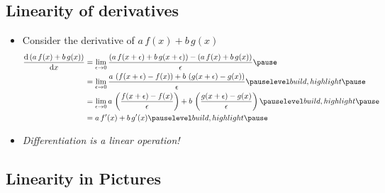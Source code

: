 \begin{slide}
\section{Linearity of derivatives}
  
\begin{PauseHighLight}
  \begin{itemize}
    \item Consider the derivative of $a\,f(x)+b\,g(x)$
    \begin{align*}
      \frac{\dd \bra{a\,f(x)+b\,g(x)}}{\dd x}
      &=
      \lim_{\epsilon\rightarrow 0}
      \frac{\bra{a\,f(x+\epsilon)+b\,g(x+\epsilon)}-\bra{a\,f(x)+b\,g(x)}}{\epsilon}
      \pause \\
      &=
      \lim_{\epsilon\rightarrow 0}
      \frac{a\, \bra{f(x+\epsilon)-f(x)} + b\,\bra{g(x+\epsilon)-g(x)}}{\epsilon}
      \pauseb \\
      &=  \lim_{\epsilon\rightarrow 0}
        a\, \bra{\frac{f(x+\epsilon)-f(x)}{\epsilon}} +
        b\,\bra{\frac{g(x+\epsilon)-g(x)}{\epsilon}}\pauseb \\
      &= a\,f'(x) + b\,g'(x) \pauseb
    \end{align*}
  \item \emph{Differentiation is a linear operation!}\pauseb
  \end{itemize}
\end{PauseHighLight}

\end{slide}


\begin{slide}
\section[-1]{Linearity in Pictures}

 \pb \pause {}
  \begin{center}
    \pause
  \end{center}

\end{slide}


